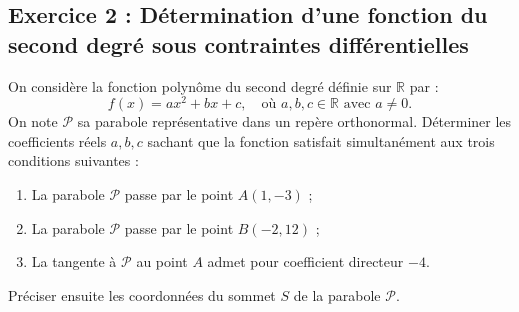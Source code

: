 \documentclass[11pt,a4paper]{article}
\newcommand{\R}{\mathbb{R}}
\begin{document}
\subsection*{Exercice 2 : Détermination d'une fonction du second degré sous contraintes différentielles}

On considère la fonction polynôme du second degré définie sur $\R$ par :
\[
f(x) = ax^2 + bx + c, \quad \text{où } a, b, c \in \R \text{ avec } a \neq 0.
\]
On note $\mathcal{P}$ sa parabole représentative dans un repère orthonormal.
Déterminer les coefficients réels $a, b, c$ sachant que la fonction satisfait simultanément aux trois conditions suivantes :
\begin{enumerate}[label=(\roman*)]
    \item La parabole $\mathcal{P}$ passe par le point $A(1, -3)$ ;
    \item La parabole $\mathcal{P}$ passe par le point $B(-2, 12)$ ;
    \item La tangente à $\mathcal{P}$ au point $A$ admet pour coefficient directeur $-4$.
\end{enumerate}
Préciser ensuite les coordonnées du sommet $S$ de la parabole $\mathcal{P}$.
\end{document}
